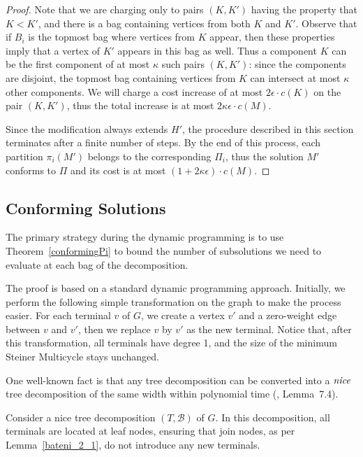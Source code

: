 \begin{proof}
Note that we are charging only to pairs \((K, K')\) having the property that \(K < K'\), and there is a bag containing vertices from both \(K\) and \(K'\). Observe that if \(B_i\) is the topmost bag where vertices from \(K\) appear, then these properties imply that a vertex of \(K'\) appears in this bag as well. Thus a component \(K\) can be the first component of at most \(\kappa\) such pairs \((K, K')\): since the components are disjoint, the topmost bag containing vertices from \(K\) can intersect at most \(\kappa\) other components. We will charge a cost increase of at most \(2 \epsilon \cdot c(K)\) on the pair \((K, K')\), thus the total increase is at most \(2\kappa\epsilon \cdot c(M)\).

Since the modification always extends \(H'\), the procedure described in this section terminates after a finite number of steps. By the end of this process, each partition \(\pi_i(M')\) belongs to the corresponding \(\Pi_i\), thus the solution \(M'\) conforms to \(\Pi\) and its cost is at most \((1 + 2\kappa\epsilon) \cdot c(M)\).
\end{proof}

\subsection{Conforming Solutions}

The primary strategy during the dynamic programming is to use Theorem~\ref{conformingPi} to bound the number of subsolutions we need to evaluate at each bag of the decomposition.

The proof is based on a standard dynamic programming approach. Initially, we perform the following simple transformation on the graph to make the process easier. 
For each terminal \(v\) of \(G\), we create a vertex \(v'\) and a zero-weight edge between \(v\) and \(v'\), then we replace \(v\) by \(v'\) as the new terminal. Notice that, after this transformation, all terminals have degree 1, and the size of the minimum Steiner Multicycle stays unchanged.

One well-known fact is that any tree decomposition can be converted into a \(\emph{nice}\) tree decomposition of the same width within polynomial time (\cite{CyganBook}, Lemma~7.4). 

Consider a nice tree decomposition $(T, \mathcal{B})$ of $G$. In this decomposition, all terminals are located at leaf nodes, ensuring that join nodes, as per Lemma~\ref{bateni_2_1}, do not introduce any new terminals.

